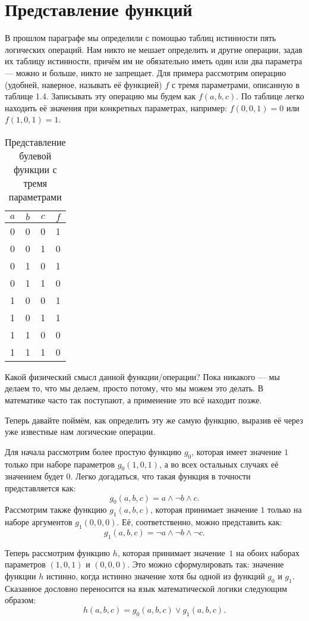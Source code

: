 \section{Представление функций}

В прошлом параграфе мы определили с помощью таблиц истинности пять логических операций. Нам никто не мешает определить и другие операции, задав их таблицу истинности, причём им не обязательно иметь один или два параметра — можно и больше, никто не запрещает. Для примера рассмотрим операцию (удобней, наверное, называть её функцией) $f$ с тремя параметрами, описанную в таблице 1.4. Записывать эту операцию мы будем как $f(a, b, c)$. По таблице легко находить её значения при конкретных параметрах, например: $f(0,0,1) = 0$ или $f(1,0,1) = 1$.

\begin{table}[h]
\centering
\begin{tabular}{ccc|c}
$a$&$b$&$c$&$f$\\
\hline
0&0&0&1\\
0&0&1&0\\
0&1&0&1\\
0&1&1&0\\
1&0&0&1\\
1&0&1&1\\
1&1&0&0\\
1&1&1&0
\end{tabular}
\caption{Представление булевой функции с тремя параметрами}
\end{table}

Какой физический смысл данной функции/операции? Пока никакого — мы делаем то, что мы делаем, просто потому, что мы можем это делать. В математике часто так поступают, а применение это всё находит позже.

Теперь давайте поймём, как определить эту же самую функцию, выразив её через уже известные нам логические операции.

Для начала рассмотрим более простую функцию $g_0$, которая имеет значение $1$ только при наборе параметров $g_0(1, 0, 1)$, а во всех остальных случаях её значением будет $0$. Легко догадаться, что такая функция в точности представляется как: $$g_0(a, b, c) = a\land \neg b \land c.$$ Рассмотрим также функцию $g_1(a, b, c)$, которая принимает значение $1$ только на наборе аргументов $g_1(0, 0, 0)$. Её, соответственно, можно представить как: $$g_1(a, b, c) = \neg a \land \neg b \land \neg c.$$

Теперь рассмотрим функцию $h$, которая принимает значение~$1$ на обоих наборах параметров $(1, 0, 1)$ и $(0, 0, 0)$. Это можно сформулировать так:   значение функции $h$ истинно, когда истинно значение хотя бы одной из функций $g_0$ и $g_1$. Сказанное дословно переносится на язык математической логики следующим образом: $$h(a, b, c) = g_0(a, b, c) \lor g_1(a, b, c).$$

